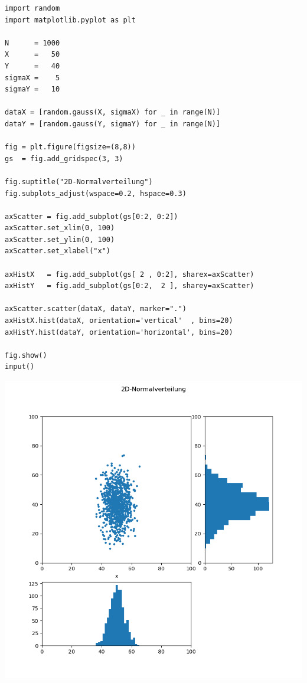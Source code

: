 \begin{codebox}
\begin{verbatim}
import random
import matplotlib.pyplot as plt

N      = 1000
X      =   50
Y      =   40
sigmaX =    5
sigmaY =   10

dataX = [random.gauss(X, sigmaX) for _ in range(N)]
dataY = [random.gauss(Y, sigmaY) for _ in range(N)]

fig = plt.figure(figsize=(8,8))
gs  = fig.add_gridspec(3, 3)

fig.suptitle("2D-Normalverteilung")
fig.subplots_adjust(wspace=0.2, hspace=0.3)

axScatter = fig.add_subplot(gs[0:2, 0:2])
axScatter.set_xlim(0, 100)
axScatter.set_ylim(0, 100)
axScatter.set_xlabel("x")

axHistX   = fig.add_subplot(gs[ 2 , 0:2], sharex=axScatter)
axHistY   = fig.add_subplot(gs[0:2,  2 ], sharey=axScatter)

axScatter.scatter(dataX, dataY, marker=".")
axHistX.hist(dataX, orientation='vertical'  , bins=20)
axHistY.hist(dataY, orientation='horizontal', bins=20)

fig.show()
input()
\end{verbatim}
\end{codebox}
%
\begin{tcolorbox}[title=Ausgabe: 2D-Normalverteilung]
\begin{center}
	\includegraphics[width=.7\linewidth]{./gfx/plt-gauss2D}
\end{center}
\end{tcolorbox}


